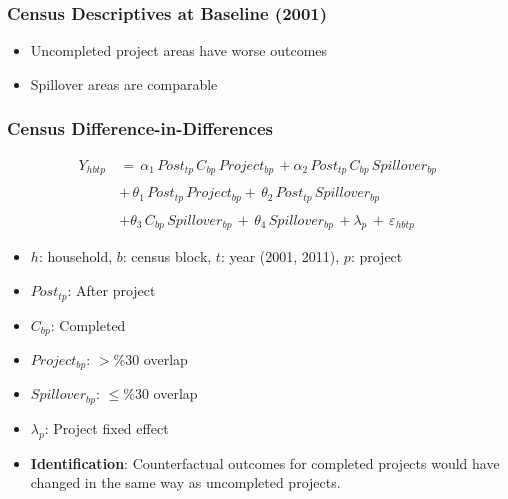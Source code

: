 \documentclass[aspectratio=149]{beamer}
\begin{document}

\begin{frame}
\frametitle{Census Descriptives at Baseline (2001)}
\begin{itemize}
    \item Uncompleted project areas have worse outcomes
    \item Spillover areas are comparable
\end{itemize}
\vspace{.1cm}
\centering
\resizebox{\textwidth}{!}{  

}
\end{frame}





\begin{frame}
\frametitle{Census Difference-in-Differences}
\begin{align*}
Y_{hbtp} \, &= \, \alpha_{1} \, Post_{tp}\,  C_{bp}\,  Project_{bp} \, + \alpha_{2} \, Post_{tp} \, C_{bp} \, Spillover_{bp} \,   \\
&\\
&+ \,\theta_1\,  Post_{tp} \, Project_{bp} + \,\theta_2 \, Post_{tp} \, Spillover_{bp}  \,  \\
&\\
& + \theta_3\,  C_{bp} \, Spillover_{bp} \, +  \, \theta_4 \, Spillover_{bp} \, +  \lambda_p \, + \, \varepsilon_{hbtp}
\end{align*}

\begin{itemize}
\item $h$: household, $b$: census block, $t$: year (2001, 2011), $p$: project
\item $Post_{tp}$: After project
\item $C_{bp}$: Completed
\item $Project_{bp}$: $>$\%30 overlap
\item $Spillover_{bp}$: $\leq$\%30 overlap
\item $\lambda_p$: Project fixed effect
\end{itemize}

\begin{itemize}
  \item \textbf{Identification}: Counterfactual outcomes for completed projects would have changed in the same way as uncompleted projects.
\end{itemize}


\end{frame}
\end{document}
